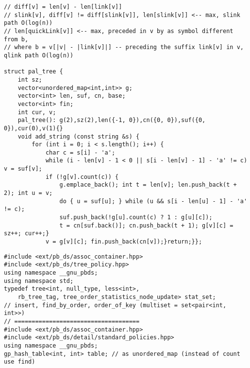 \documentclass[12pt]{article}
\begin{document}
\begin{verbatim}
// diff[v] = len[v] - len[link[v]]
// slink[v], diff[v] != diff[slink[v]], len[slink[v]] <-- max, slink path O(log(n))
// len[quickLink[v]] <-- max, preceded in v by as symbol different from b,
// where b = v[|v| - |link[v]|] -- preceding the suffix link[v] in v, qlink path O(log(n))

struct pal_tree {
    int sz;
    vector<unordered_map<int,int>> g;
    vector<int> len, suf, cn, base;
    vector<int> fin;
    int cur, v;
    pal_tree(): g(2),sz(2),len({-1, 0}),cn({0, 0}),suf({0, 0}),cur(0),v(1){}
    void add_string (const string &s) {
        for (int i = 0; i < s.length(); i++) {
            char c = s[i] - 'a';
            while (i - len[v] - 1 < 0 || s[i - len[v] - 1] - 'a' != c) v = suf[v];
            if (!g[v].count(c)) {
                g.emplace_back(); int t = len[v]; len.push_back(t + 2); int u = v;
                do { u = suf[u]; } while (u && s[i - len[u] - 1] - 'a' != c);
                suf.push_back(!g[u].count(c) ? 1 : g[u][c]);
                t = cn[suf.back()]; cn.push_back(t + 1); g[v][c] = sz++; cur++;}
            v = g[v][c]; fin.push_back(cn[v]);}return;}};
\end{verbatim}

\begin{verbatim}
#include <ext/pb_ds/assoc_container.hpp>
#include <ext/pb_ds/tree_policy.hpp>
using namespace __gnu_pbds;
using namespace std;
typedef tree<int, null_type, less<int>, 
    rb_tree_tag, tree_order_statistics_node_update> stat_set;
// insert, find_by_order, order_of_key (multiset = set<pair<int, int>>)
// ====================================
#include <ext/pb_ds/assoc_container.hpp>
#include <ext/pb_ds/detail/standard_policies.hpp>
using namespace __gnu_pbds;
gp_hash_table<int, int> table; // as unordered_map (instead of count use find)
\end{verbatim}
\end{document}
